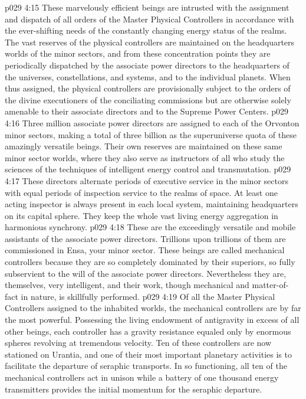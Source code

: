 \pc \vs p029 4:15 \bibnobreakspace {} These marvelously efficient beings are intrusted with the assignment and dispatch of all orders of the Master Physical Controllers in accordance with the ever\hyp{}shifting needs of the constantly changing energy status of the realms. The vast reserves of the physical controllers are maintained on the headquarters worlds of the minor sectors, and from these concentration points they are periodically dispatched by the associate power directors to the headquarters of the universes, constellations, and systems, and to the individual planets. When thus assigned, the physical controllers are provisionally subject to the orders of the divine executioners of the conciliating commissions but are otherwise solely amenable to their associate directors and to the Supreme Power Centers.
\vs p029 4:16 Three million associate power directors are assigned to each of the Orvonton minor sectors, making a total of three billion as the superuniverse quota of these amazingly versatile beings. Their own reserves are maintained on these same minor sector worlds, where they also serve as instructors of all who study the sciences of the techniques of intelligent energy control and transmutation.
\vs p029 4:17 These directors alternate periods of executive service in the minor sectors with equal periods of inspection service to the realms of space. At least one acting inspector is always present in each local system, maintaining headquarters on its capital sphere. They keep the whole vast living energy aggregation in harmonious synchrony.
\pc \vs p029 4:18 \bibnobreakspace {} These are the exceedingly versatile and mobile assistants of the associate power directors. Trillions upon trillions of them are commissioned in Ensa, your minor sector. These beings are called mechanical controllers because they are so completely dominated by their superiors, so fully subservient to the will of the associate power directors. Nevertheless they are, themselves, very intelligent, and their work, though mechanical and matter\hyp{}of\hyp{}fact in nature, is skillfully performed.
\vs p029 4:19 Of all the Master Physical Controllers assigned to the inhabited worlds, the mechanical controllers are by far the most powerful. Possessing the living endowment of antigravity in excess of all other beings, each controller has a gravity resistance equaled only by enormous spheres revolving at tremendous velocity. Ten of these controllers are now stationed on Urantia, and one of their most important planetary activities is to facilitate the departure of seraphic transports. In so functioning, all ten of the mechanical controllers act in unison while a battery of one thousand energy transmitters provides the initial momentum for the seraphic departure.
